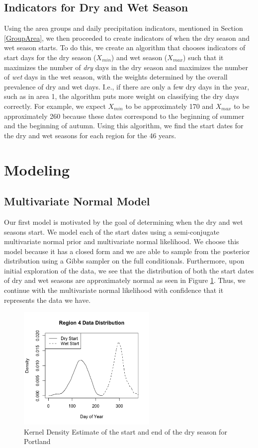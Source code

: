 \documentclass{article}
\begin{document}
\subsection{Indicators for Dry and Wet Season}
Using the area groups and daily precipitation indicators, mentioned in Section \ref{GroupArea}, we then proceeded to create indicators of when the dry season and wet season starts. To do this, we create an algorithm that chooses indicators of start days for  the dry season ($X_{min}$) and wet season ($X_{max}$) such that it maximizes the number of \textit{dry} days in the dry season and maximizes the number of \textit{wet} days in the wet season, with the weights determined by the overall prevalence of dry and wet days. I.e., if there are only a few dry days in the year, such as in area 1, the algorithm puts more weight on classifying the dry days correctly. For example, we expect $X_{min}$ to be approximately 170 and $X_{max}$ to be approximately 260 because these dates correspond to the beginning of summer and the beginning of autumn. Using this algorithm, we find the start dates for the dry and wet seasons for each region for the 46 years.


\section{Modeling}
\subsection{Multivariate Normal Model}
Our first model is motivated by the goal of determining when the dry and wet seasons start. We model each of the start dates using a semi-conjugate multivariate normal prior and multivariate normal likelihood. We choose this model because it has a closed form and we are able to sample from the posterior distribution using a Gibbs sampler on the full conditionals. Furthermore, upon initial exploration of the data, we see that the distribution of both the start dates of dry and wet seasons are approximately normal as seen in Figure \ref{PDXexample}. Thus, we continue with the multivariate normal likelihood with confidence that it represents the data we have. 

\begin{figure}[H]
\includegraphics[width = .4\textwidth, height = 6cm]{Area4DataDistribution}
\caption{Kernel Density Estimate of the start and end of the dry season for Portland}
\label{PDXexample}
\end{figure}
\end{document}
